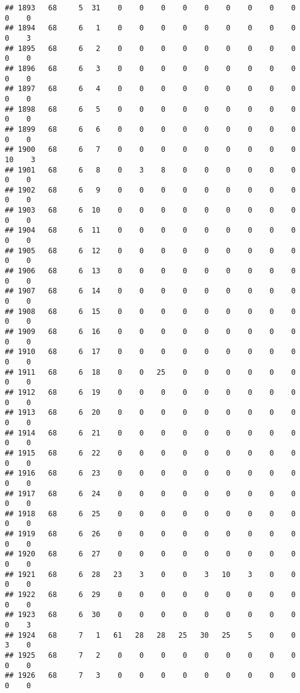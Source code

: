 \documentclass[]{article}
\begin{document}
\begin{verbatim}
## 1893   68     5  31    0    0    0    0    0    0    0    0    0    0    0
## 1894   68     6   1    0    0    0    0    0    0    0    0    0    0    3
## 1895   68     6   2    0    0    0    0    0    0    0    0    0    0    0
## 1896   68     6   3    0    0    0    0    0    0    0    0    0    0    0
## 1897   68     6   4    0    0    0    0    0    0    0    0    0    0    0
## 1898   68     6   5    0    0    0    0    0    0    0    0    0    0    0
## 1899   68     6   6    0    0    0    0    0    0    0    0    0    0    0
## 1900   68     6   7    0    0    0    0    0    0    0    0    0   10    3
## 1901   68     6   8    0    3    8    0    0    0    0    0    0    0    0
## 1902   68     6   9    0    0    0    0    0    0    0    0    0    0    0
## 1903   68     6  10    0    0    0    0    0    0    0    0    0    0    0
## 1904   68     6  11    0    0    0    0    0    0    0    0    0    0    0
## 1905   68     6  12    0    0    0    0    0    0    0    0    0    0    0
## 1906   68     6  13    0    0    0    0    0    0    0    0    0    0    0
## 1907   68     6  14    0    0    0    0    0    0    0    0    0    0    0
## 1908   68     6  15    0    0    0    0    0    0    0    0    0    0    0
## 1909   68     6  16    0    0    0    0    0    0    0    0    0    0    0
## 1910   68     6  17    0    0    0    0    0    0    0    0    0    0    0
## 1911   68     6  18    0    0   25    0    0    0    0    0    0    0    0
## 1912   68     6  19    0    0    0    0    0    0    0    0    0    0    0
## 1913   68     6  20    0    0    0    0    0    0    0    0    0    0    0
## 1914   68     6  21    0    0    0    0    0    0    0    0    0    0    0
## 1915   68     6  22    0    0    0    0    0    0    0    0    0    0    0
## 1916   68     6  23    0    0    0    0    0    0    0    0    0    0    0
## 1917   68     6  24    0    0    0    0    0    0    0    0    0    0    0
## 1918   68     6  25    0    0    0    0    0    0    0    0    0    0    0
## 1919   68     6  26    0    0    0    0    0    0    0    0    0    0    0
## 1920   68     6  27    0    0    0    0    0    0    0    0    0    0    0
## 1921   68     6  28   23    3    0    0    3   10    3    0    0    0    0
## 1922   68     6  29    0    0    0    0    0    0    0    0    0    0    0
## 1923   68     6  30    0    0    0    0    0    0    0    0    0    0    3
## 1924   68     7   1   61   28   28   25   30   25    5    0    0    3    0
## 1925   68     7   2    0    0    0    0    0    0    0    0    0    0    0
## 1926   68     7   3    0    0    0    0    0    0    0    0    0    0    0

\end{verbatim}
\end{document}
